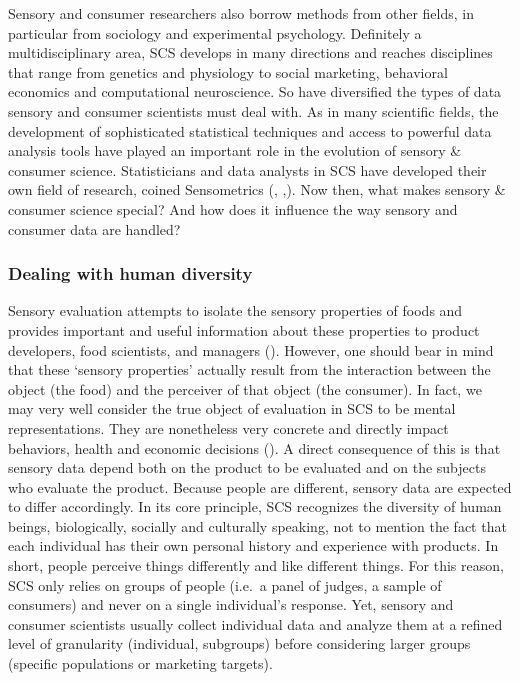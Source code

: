 \documentclass[
]{book}
\begin{document}
Sensory and consumer researchers also borrow methods from other fields, in particular from sociology and experimental psychology. Definitely a multidisciplinary area, SCS develops in many directions and reaches disciplines that range from genetics and physiology to social marketing, behavioral economics and computational neuroscience. So have diversified the types of data sensory and consumer scientists must deal with. As in many scientific fields, the development of sophisticated statistical techniques and access to powerful data analysis tools have played an important role in the evolution of sensory \& consumer science. Statisticians and data analysts in SCS have developed their own field of research, coined Sensometrics (\citet{Schlich1993}, \citet{Brockhoff2011} ,\citet{Qannari2017}). Now then, what makes sensory \& consumer science special? And how does it influence the way sensory and consumer data are handled?

\hypertarget{dealing-with-human-diversity}{%
\subsubsection*{Dealing with human diversity}\label{dealing-with-human-diversity}}

Sensory evaluation attempts to isolate the sensory properties of foods and provides important and useful information about these properties to product developers, food scientists, and managers (\citet{LawlessHeym2010}). However, one should bear in mind that these `sensory properties' actually result from the interaction between the object (the food) and the perceiver of that object (the consumer). In fact, we may very well consider the true object of evaluation in SCS to be mental representations. They are nonetheless very concrete and directly impact behaviors, health and economic decisions (\citet{Kahneman2000}).
A direct consequence of this is that sensory data depend both on the product to be evaluated and on the subjects who evaluate the product. Because people are different, sensory data are expected to differ accordingly. In its core principle, SCS recognizes the diversity of human beings, biologically, socially and culturally speaking, not to mention the fact that each individual has their own personal history and experience with products. In short, people perceive things differently and like different things. For this reason, SCS only relies on groups of people (i.e.~a panel of judges, a sample of consumers) and never on a single individual's response. Yet, sensory and consumer scientists usually collect individual data and analyze them at a refined level of granularity (individual, subgroups) before considering larger groups (specific populations or marketing targets).
\end{document}
